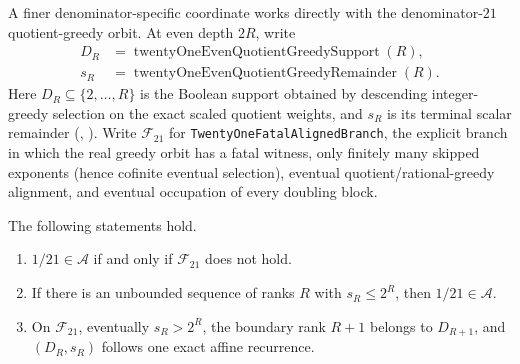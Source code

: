 \documentclass[11pt]{article}
\newcommand{\Ach}{\mathcal A}
\begin{document}
A finer denominator-specific coordinate works directly with the
denominator-$21$ quotient-greedy orbit.
At even depth $2R$, write
\[
 \begin{aligned}
 D_R&=\operatorname{twentyOneEvenQuotientGreedySupport}(R),\\
 s_R&=\operatorname{twentyOneEvenQuotientGreedyRemainder}(R).
 \end{aligned}
\]
Here $D_R\subseteq\{2,\ldots,R\}$ is the Boolean support obtained by descending
integer-greedy selection on the exact scaled quotient weights, and $s_R$ is its
terminal scalar remainder
(,
).
Write $\mathcal F_{21}$ for \texttt{TwentyOneFatalAlignedBranch}, the explicit
branch in which the real greedy orbit has a fatal witness, only finitely many
skipped exponents (hence cofinite eventual selection), eventual
quotient/rational-greedy alignment, and eventual occupation of every doubling
block.

\begin{theorem}
\label{res:one-over-twenty-one-frontier}
The following statements hold.
\begin{enumerate}
\item $1/21\in\Ach$ if and only if $\mathcal F_{21}$ does not hold.
\item If there is an unbounded sequence of ranks $R$ with $s_R\le 2^R$,
  then $1/21\in\Ach$.
\item On $\mathcal F_{21}$, eventually $s_R>2^R$, the boundary rank $R+1$
  belongs to $D_{R+1}$, and $(D_R,s_R)$ follows one exact affine recurrence.
\end{enumerate}
\end{theorem}
\end{document}
